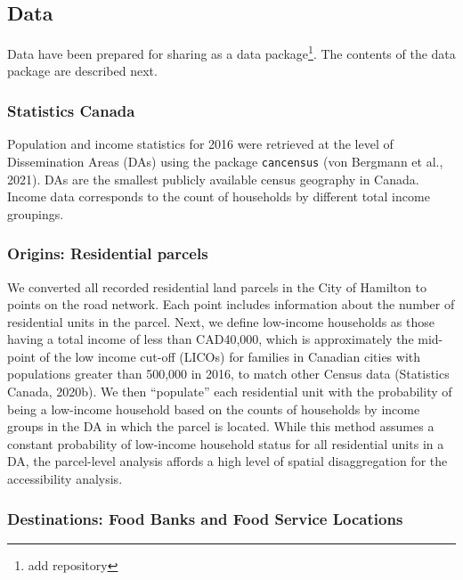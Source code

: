\documentclass[]{elsarticle} %
\begin{document}
\hypertarget{data}{%
\subsection{Data}\label{data}}

Data have been prepared for sharing as a data package\footnote{add
  repository}. The contents of the data package are described next.

\hypertarget{statistics-canada}{%
\subsubsection{Statistics Canada}\label{statistics-canada}}

Population and income statistics for 2016 were retrieved at the level of
Dissemination Areas (DAs) using the package \texttt{cancensus} (von
Bergmann et al., 2021). DAs are the smallest publicly available census
geography in Canada. Income data corresponds to the count of households
by different total income groupings.

\hypertarget{origins-residential-parcels}{%
\subsubsection{Origins: Residential
parcels}\label{origins-residential-parcels}}

We converted all recorded residential land parcels in the City of
Hamilton to points on the road network. Each point includes information
about the number of residential units in the parcel. Next, we define
low-income households as those having a total income of less than
CAD40,000, which is approximately the mid-point of the low income
cut-off (LICOs) for families in Canadian cities with populations greater
than 500,000 in 2016, to match other Census data (Statistics Canada,
2020b). We then ``populate'' each residential unit with the probability
of being a low-income household based on the counts of households by
income groups in the DA in which the parcel is located. While this
method assumes a constant probability of low-income household status for
all residential units in a DA, the parcel-level analysis affords a high
level of spatial disaggregation for the accessibility analysis.

\hypertarget{destinations-food-banks-and-food-service-locations}{%
\subsubsection{Destinations: Food Banks and Food Service
Locations}\label{destinations-food-banks-and-food-service-locations}}
\end{document}
